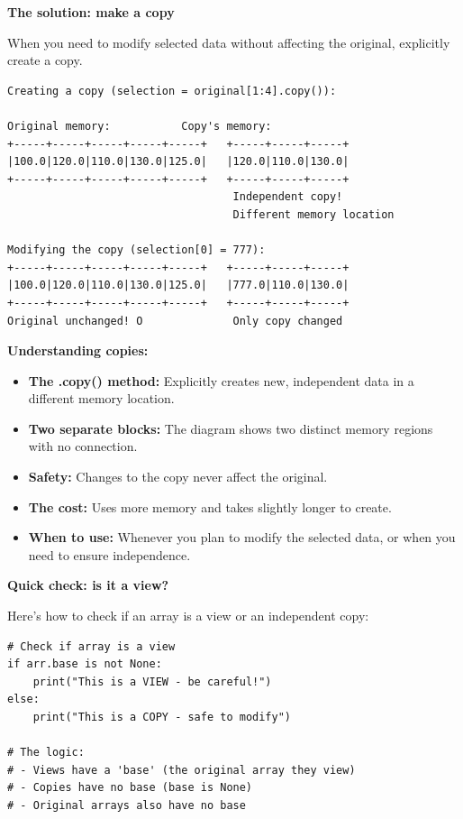 \begin{tcolorbox}[
    title=Views vs copies illustrated,
    colframe=purple,
    colback = white,
    arc=2mm,
    breakable
]
\textbf{The solution: make a copy}

When you need to modify selected data without affecting the original, explicitly create a copy.

\begin{lstlisting}[basicstyle=\ttfamily\footnotesize,breaklines=true,columns=fullflexible,keepspaces=true,xleftmargin=0pt]
Creating a copy (selection = original[1:4].copy()):

Original memory:           Copy's memory:
+-----+-----+-----+-----+-----+   +-----+-----+-----+
|100.0|120.0|110.0|130.0|125.0|   |120.0|110.0|130.0|
+-----+-----+-----+-----+-----+   +-----+-----+-----+
                                   Independent copy!
                                   Different memory location

Modifying the copy (selection[0] = 777):
+-----+-----+-----+-----+-----+   +-----+-----+-----+
|100.0|120.0|110.0|130.0|125.0|   |777.0|110.0|130.0|
+-----+-----+-----+-----+-----+   +-----+-----+-----+
Original unchanged! O              Only copy changed
\end{lstlisting}

\textbf{Understanding copies:}
\begin{itemize}
\item \textbf{The .copy() method:} Explicitly creates new, independent data in a different memory location.
\item \textbf{Two separate blocks:} The diagram shows two distinct memory regions with no connection.
\item \textbf{Safety:} Changes to the copy never affect the original.
\item \textbf{The cost:} Uses more memory and takes slightly longer to create.
\item \textbf{When to use:} Whenever you plan to modify the selected data, or when you need to ensure independence.
\end{itemize}

\textbf{Quick check: is it a view?}

Here's how to check if an array is a view or an independent copy:

\begin{lstlisting}[basicstyle=\ttfamily\footnotesize,breaklines=true,columns=fullflexible,keepspaces=true,xleftmargin=0pt]
# Check if array is a view
if arr.base is not None:
    print("This is a VIEW - be careful!")
else:
    print("This is a COPY - safe to modify")

# The logic:
# - Views have a 'base' (the original array they view)
# - Copies have no base (base is None)
# - Original arrays also have no base
\end{lstlisting}
\vspace{2em}


\end{tcolorbox}
